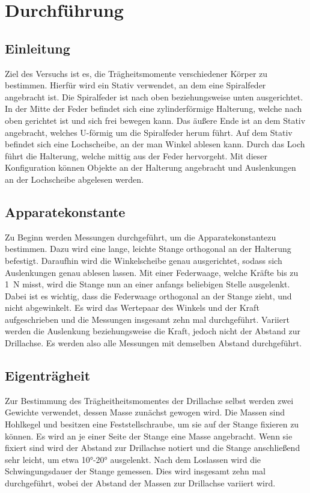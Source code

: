 \section{Durchführung}
\label{sec:Durchführung}

\subsection{Einleitung}
Ziel des Versuchs ist es, die Trägheitsmomente verschiedener Körper zu bestimmen. Hierfür wird ein Stativ verwendet, an dem eine Spiralfeder angebracht ist.
Die Spiralfeder ist nach oben beziehungsweise unten ausgerichtet. In der Mitte der Feder befindet sich eine zylinderförmige Halterung, welche nach oben gerichtet ist und sich frei bewegen kann.
Das äußere Ende ist an dem Stativ angebracht, welches U-förmig um die Spiralfeder herum führt. Auf dem Stativ befindet sich eine Lochscheibe, an der man Winkel ablesen kann.
Durch das Loch führt die Halterung, welche mittig aus der Feder hervorgeht. Mit dieser Konfiguration können Objekte an der Halterung angebracht und Auslenkungen an 
der Lochscheibe abgelesen werden.

\subsection{Apparatekonstante}
Zu Beginn werden Messungen durchgeführt, um die Apparatekonstantezu bestimmen.
Dazu wird eine lange, leichte Stange orthogonal an der Halterung befestigt. Daraufhin wird die Winkelscheibe genau ausgerichtet, sodass sich Auslenkungen genau ablesen lassen.
Mit einer Federwaage, welche Kräfte bis zu \SI{1}{\newton} misst, wird die Stange nun an einer anfangs beliebigen Stelle ausgelenkt. Dabei ist es wichtig, dass die Federwaage
orthogonal an der Stange zieht, und nicht abgewinkelt. Es wird das Wertepaar des Winkels und der Kraft aufgeschrieben und die Messungen insgesamt zehn mal durchgeführt.
Variiert werden die Auslenkung beziehungsweise die Kraft, jedoch nicht der Abstand zur Drillachse. Es werden also alle Messungen mit demselben Abstand durchgeführt.

\subsection{Eigenträgheit}
Zur Bestimmung des Trägheitheitsmomentes der Drillachse selbst werden zwei Gewichte verwendet, dessen Masse zunächst gewogen wird.
Die Massen sind Hohlkegel und besitzen eine Feststellschraube, um sie auf der Stange fixieren zu können.
Es wird an je einer Seite der Stange eine Masse angebracht. Wenn sie fixiert sind wird der Abstand zur Drillachse notiert und die Stange anschließend sehr leicht,
um etwa \ang{10;;}-\ang{20;;} ausgelenkt. Nach dem Loslassen wird die Schwingungsdauer der Stange gemessen.
Dies wird insgesamt zehn mal durchgeführt, wobei der Abstand der Massen zur Drillachse variiert wird.

